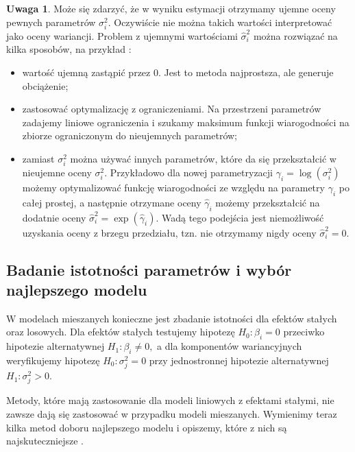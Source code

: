 \documentclass[12pt]{mwbk}
\theoremstyle{plain}
\theoremstyle{definition}
\theoremstyle{definition}
\newtheorem{uwaga}{Uwaga}[chapter]
\begin{document}
\begin{uwaga}
	Może się zdarzyć, że w wyniku estymacji otrzymamy ujemne oceny pewnych parametrów $\sigma_i^2$. Oczywiście nie można takich wartości interpretować jako oceny wariancji. Problem z ujemnymi wartościami $\hat{\sigma}^2_i$ można rozwiązać na kilka sposobów, na przykład \cite{biecek}:
	\begin{itemize}
		\item wartość ujemną zastąpić przez 0. Jest to metoda najprostsza, ale generuje obciążenie;
		\item zastosować optymalizację z ograniczeniami. Na przestrzeni parametrów zadajemy liniowe ograniczenia i szukamy maksimum funkcji wiarogodności na zbiorze ograniczonym do nieujemnych parametrów;
		\item zamiast $\sigma_i^2$ można używać innych parametrów, które da się przekształcić w nieujemne oceny $\sigma^2_i$. Przykładowo dla nowej parametryzacji $\gamma_i=\log(\sigma^2_i)$ możemy optymalizować funkcję wiarogodności ze względu na parametry $\gamma_i$ po całej prostej, a następnie otrzymane oceny $\hat{\gamma}_i$ możemy przekształcić na dodatnie oceny $\hat{\sigma}_i^2=\exp(\hat{\gamma}_i)$. Wadą tego podejścia jest niemożliwość uzyskania oceny z brzegu przedziału, tzn. nie otrzymamy nigdy oceny $\hat{\sigma}^2_i=0$.
	\end{itemize}
\end{uwaga}


\subsection{Badanie istotności parametrów i wybór najlepszego modelu}

W modelach mieszanych konieczne jest zbadanie istotności dla efektów stałych oraz losowych. Dla efektów stałych testujemy hipotezę $H_0: \beta_i=0$ przeciwko hipotezie alternatywnej $H_1: \beta_i \neq 0,$ a dla komponentów wariancyjnych weryfikujemy hipotezę $H_0: \sigma^2_j=0$ przy jednostronnej hipotezie alternatywnej  $H_1: \sigma^2_j>0.$ 



Metody, które mają zastosowanie dla modeli liniowych z efektami stałymi, nie zawsze dają się zastosować w przypadku modeli mieszanych. Wymienimy teraz kilka metod doboru najlepszego modelu i opiszemy, które z nich są najskuteczniejsze \cite{faraway}.
\end{document}
